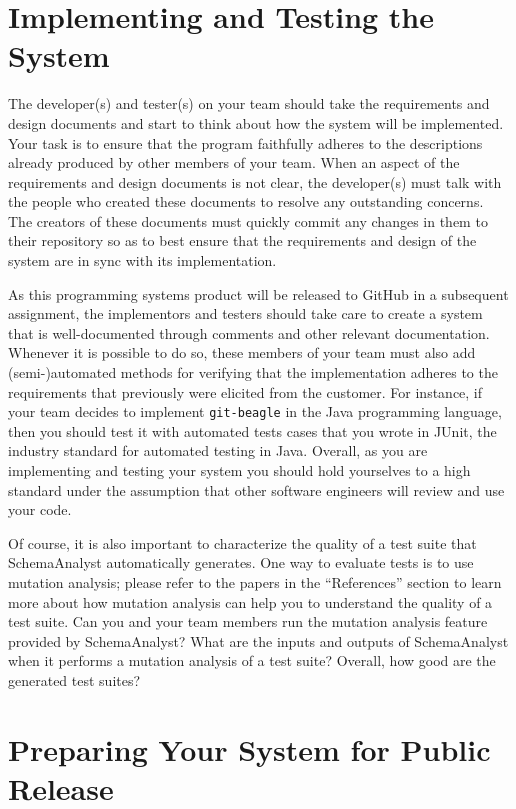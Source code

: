 \section*{Implementing and Testing the System}

The developer(s) and tester(s) on your team should take the requirements and design documents and start to think about
how the system will be implemented. Your task is to ensure that the program faithfully adheres to the descriptions
already produced by other members of your team. When an aspect of the requirements and design documents is not clear,
the developer(s) must talk with the people who created these documents to resolve any outstanding concerns. The creators
of these documents must quickly commit any changes in them to their repository so as to best ensure that the
requirements and design of the system are in sync with its implementation.

As this programming systems product will be released to GitHub in a subsequent assignment, the implementors and testers
should take care to create a system that is well-documented through comments and other relevant documentation. Whenever
it is possible to do so, these members of your team must also add (semi-)automated methods for verifying that the
implementation adheres to the requirements that previously were elicited from the customer. For instance, if your team
decides to implement {\tt git-beagle} in the Java programming language, then you should test it with automated tests
cases that you wrote in JUnit, the industry standard for automated testing in Java. Overall, as you are implementing and
testing your system you should hold yourselves to a high standard under the assumption that other software engineers
will review and use your code.

Of course, it is also important to characterize the quality of a test suite that SchemaAnalyst automatically generates.
One way to evaluate tests is to use mutation analysis; please refer to the papers in the ``References'' section to learn
more about how mutation analysis can help you to understand the quality of a test suite. Can you and your team members
run the mutation analysis feature provided by SchemaAnalyst? What are the inputs and outputs of SchemaAnalyst when it
performs a mutation analysis of a test suite? Overall, how good are the generated test suites?

\vspace*{-.05in}
\section*{Preparing Your System for Public Release}

